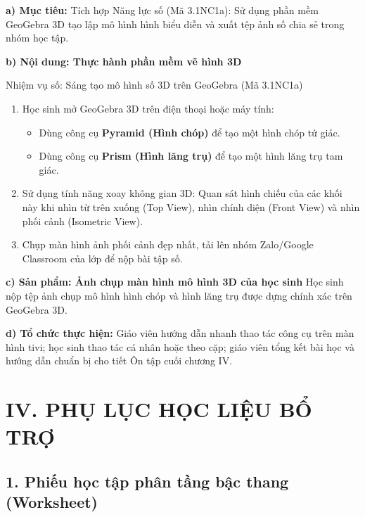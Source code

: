 \documentclass[12pt, a4paper]{article}
\begin{document}
\noindent \textbf{a) Mục tiêu:}
Tích hợp Năng lực số (Mã 3.1NC1a): Sử dụng phần mềm GeoGebra 3D tạo lập mô hình hình biểu diễn và xuất tệp ảnh số chia sẻ trong nhóm học tập.

\noindent \textbf{b) Nội dung: Thực hành phần mềm vẽ hình 3D}
\begin{aibox}{Nhiệm vụ số: Sáng tạo mô hình số 3D trên GeoGebra (Mã 3.1NC1a)}
\begin{enumerate}[leftmargin=0.6cm]
    \item Học sinh mở GeoGebra 3D trên điện thoại hoặc máy tính:
    \begin{itemize}
        \item Dùng công cụ \textbf{Pyramid (Hình chóp)} để tạo một hình chóp tứ giác.
        \item Dùng công cụ \textbf{Prism (Hình lăng trụ)} để tạo một hình lăng trụ tam giác.
    \end{itemize}
    \item Sử dụng tính năng xoay không gian 3D: Quan sát hình chiếu của các khối này khi nhìn từ trên xuống (Top View), nhìn chính diện (Front View) và nhìn phối cảnh (Isometric View).
    \item Chụp màn hình ảnh phối cảnh đẹp nhất, tải lên nhóm Zalo/Google Classroom của lớp để nộp bài tập số.
\end{enumerate}
\end{aibox}

\noindent \textbf{c) Sản phẩm: Ảnh chụp màn hình mô hình 3D của học sinh}
Học sinh nộp tệp ảnh chụp mô hình hình chóp và hình lăng trụ được dựng chính xác trên GeoGebra 3D.

\noindent \textbf{d) Tổ chức thực hiện:}
Giáo viên hướng dẫn nhanh thao tác công cụ trên màn hình tivi; học sinh thao tác cá nhân hoặc theo cặp; giáo viên tổng kết bài học và hướng dẫn chuẩn bị cho tiết Ôn tập cuối chương IV.

\section*{IV. PHỤ LỤC HỌC LIỆU BỔ TRỢ}

\subsection*{1. Phiếu học tập phân tầng bậc thang (Worksheet)}
\end{document}
